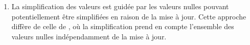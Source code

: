 \begin{description}[wide=0pt]
\begin{enumerate}
              \item La simplification des valeurs est guidée par les valeurs nulles pouvant potentiellement être simplifiées en raison de la mise à jour.
                    Cette approche diffère de celle de \cite{chabinConsistentUpdatingDatabases2020}, où la simplification prend en compte l'ensemble des valeurs nulles indépendamment de la mise à jour.
          \end{enumerate}
\end{description}
